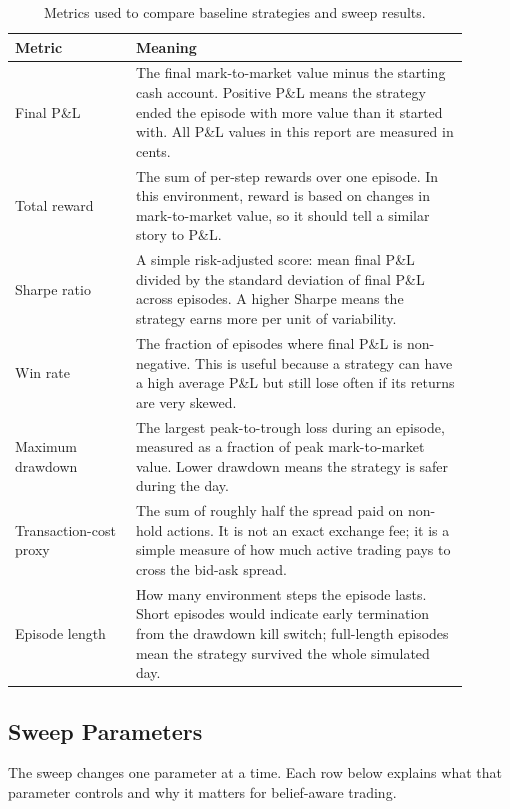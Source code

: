 \documentclass[11pt]{article}
\begin{document}
\begin{table}[H]
\centering
\small
\begin{tabular}{p{0.24\linewidth}p{0.66\linewidth}}
\toprule
Metric & Meaning \\
\midrule
Final P\&L &
The final mark-to-market value minus the starting cash account. Positive P\&L
means the strategy ended the episode with more value than it started with. All
P\&L values in this report are measured in cents. \\
Total reward &
The sum of per-step rewards over one episode. In this environment, reward is
based on changes in mark-to-market value, so it should tell a similar story to
P\&L. \\
Sharpe ratio &
A simple risk-adjusted score: mean final P\&L divided by the standard deviation
of final P\&L across episodes. A higher Sharpe means the strategy earns more
per unit of variability. \\
Win rate &
The fraction of episodes where final P\&L is non-negative. This is useful
because a strategy can have a high average P\&L but still lose often if its
returns are very skewed. \\
Maximum drawdown &
The largest peak-to-trough loss during an episode, measured as a fraction of
peak mark-to-market value. Lower drawdown means the strategy is safer during
the day. \\
Transaction-cost proxy &
The sum of roughly half the spread paid on non-hold actions. It is not an exact
exchange fee; it is a simple measure of how much active trading pays to cross
the bid-ask spread. \\
Episode length &
How many environment steps the episode lasts. Short episodes would indicate
early termination from the drawdown kill switch; full-length episodes mean the
strategy survived the whole simulated day. \\
\bottomrule
\end{tabular}
\caption{Metrics used to compare baseline strategies and sweep results.}
\label{tab:metric-glossary}
\end{table}

\subsection{Sweep Parameters}

The sweep changes one parameter at a time. Each row below explains what that
parameter controls and why it matters for belief-aware trading.
\end{document}
